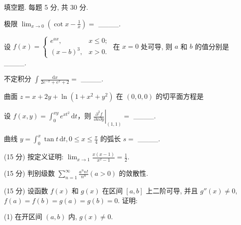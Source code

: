 \par{}
填空题. 每题 5 分, 共 30 分.\par
极限 $\lim_{x\to 0}\left(\cot x - \frac{1}{x}\right) =$ \_\_\_\_.\par
设 $f(x) = \begin{cases} e^{ax}, & x \leq 0; \\ (x - b)^3, & x > 0. \end{cases}$ 在 $x = 0$ 处可导, 则 $a$ 和 $b$ 的值分别是 \_\_\_\_.\par
不定积分 $\int \frac{\mathrm{d}x}{2e^{-x} + e^x + 2} =$ \_\_\_\_.\par
曲面 $z = x + 2y + \ln (1 + x^2 + y^2)$ 在 $(0,0,0)$ 的切平面方程是\par
设 $f(x, y) = \int_{0}^{xy} e^{xt^2} \, \mathrm{d}t$，则 $\left. \frac{\partial^2 f}{\partial x \partial y} \right|_{(1,1)} =$ \_\_\_\_.\par
曲线 $y = \int_0^x \tan t \, \mathrm{d}t, 0 \leq x \leq \frac{\pi}{4}$ 的弧长 $s =$ \_\_\_\_.\par
\par{}
(15 分) 按定义证明: $\lim_{x \to 1} \frac{x(x - 1)}{x^2 - 1} = \frac{1}{2}$.\par
\par{}
(15 分) 判别级数 $\sum_{n=1}^{\infty} \frac{a^n n!}{n^n} (a > 0)$ 的敛散性.\par
\par{}
(15 分) 设函数 $f(x)$ 和 $g(x)$ 在区间 $[a, b]$ 上二阶可导, 并且 $g''(x) \neq 0$, $f(a) = f(b) = g(a) = g(b) = 0$. 证明:\par
(1) 在开区间 $(a, b)$ 内, $g(x) \neq 0$.\par
